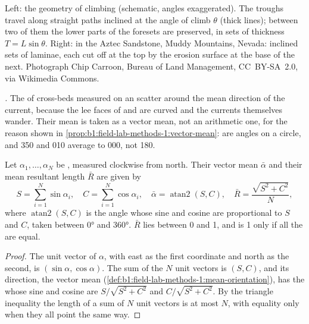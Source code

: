 \begin{omfigure}
{\small Left: the geometry of climbing  (schematic, angles exaggerated).
The troughs travel along straight paths inclined at the angle of climb $\theta$
(thick lines); between two of them the lower parts of the foresets are
preserved, in sets of thickness $T = L\sin\theta$. Right:  in the
Aztec Sandstone, Muddy Mountains, Nevada: inclined sets of laminae, each cut off
at the top by the erosion surface at the base of the next. Photograph Chip
Carroon, Bureau of Land Management, CC~BY-SA~2.0, via Wikimedia Commons.}
\label{fig:b1:clastic-sediments:climb}
\end{omfigure}

\emph{.} The  of cross-beds measured on an 
scatter around the mean direction of the current, because the lee faces of
 and  are curved and the currents themselves wander. Their mean is
taken as a vector mean, not an arithmetic one, for the reason shown in
\cref{prop:b1:field-lab-methods-1:vector-mean}:  are angles on a
circle, and 350 and 010 average to 000, not 180.

\begin{proposition}\label{prop:b1:clastic-sediments:azimuths}
Let $\alpha_1, \ldots, \alpha_N$ be , measured clockwise from north.
Their vector mean $\bar\alpha$ and their mean resultant length $\bar R$ are
given by
\[
  S = \sum_{i=1}^N \sin\alpha_i, \quad C = \sum_{i=1}^N \cos\alpha_i, \quad
  \bar\alpha = \operatorname{atan2}(S, C), \quad \bar R = \frac{\sqrt{S^2 + C^2}}{N},
\]
where $\operatorname{atan2}(S, C)$ is the angle whose sine and cosine are
proportional to $S$ and $C$, taken between \ang{0} and \ang{360}. $\bar R$ lies
between 0 and 1, and is 1 only if all the  are equal.
\end{proposition}

\begin{proof}
The unit vector of  $\alpha$, with east as the first coordinate and north
as the second, is $(\sin\alpha, \cos\alpha)$. The sum of the $N$ unit vectors is
$(S, C)$, and its direction, the vector mean
(\cref{def:b1:field-lab-methods-1:mean-orientation}), has the  whose
sine and cosine are $S/\sqrt{S^2+C^2}$ and $C/\sqrt{S^2+C^2}$. By the triangle
inequality the length of a sum of $N$ unit vectors is at most $N$, with equality
only when they all point the same way.
\end{proof}

